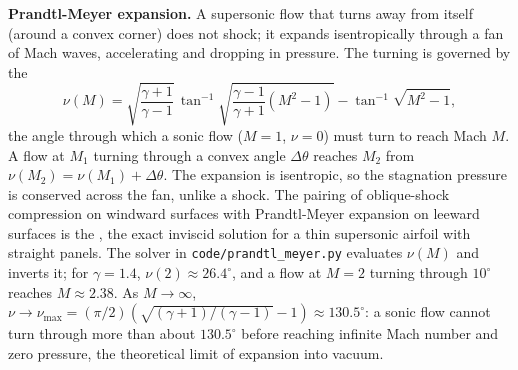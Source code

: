 \begin{mastery}
\textbf{Prandtl-Meyer expansion.} A supersonic flow that turns away
from itself (around a convex corner) does not shock; it expands
isentropically through a fan of Mach waves, accelerating and dropping
in pressure. The turning is governed by the 
\[
\nu(M) = \sqrt{\frac{\gamma + 1}{\gamma - 1}}\,\tan^{-1}\!\sqrt{
\frac{\gamma - 1}{\gamma + 1}(M^2 - 1)} - \tan^{-1}\!\sqrt{M^2 - 1},
\]
the angle through which a sonic flow ($M = 1$, $\nu = 0$) must turn to
reach Mach $M$. A flow at $M_1$ turning through a convex angle
$\Delta\theta$ reaches $M_2$ from $\nu(M_2) = \nu(M_1) + \Delta\theta$.
The expansion is isentropic, so the stagnation pressure is conserved
across the fan, unlike a shock. The pairing of oblique-shock
compression on windward surfaces with Prandtl-Meyer expansion on
leeward surfaces is the , the exact
inviscid solution for a thin supersonic airfoil with straight panels.
The solver in \texttt{code/prandtl\_meyer.py} evaluates $\nu(M)$ and
inverts it; for $\gamma = 1.4$, $\nu(2) \approx 26.4^{\circ}$, and a
flow at $M = 2$ turning through $10^{\circ}$ reaches $M \approx 2.38$.
As $M \to \infty$, $\nu \to \nu_{\max} = (\pi/2)
(\sqrt{(\gamma+1)/(\gamma-1)} - 1) \approx 130.5^{\circ}$: a sonic flow
cannot turn through more than about $130.5^{\circ}$ before reaching
infinite Mach number and zero pressure, the theoretical limit of
expansion into vacuum.
\end{mastery}

